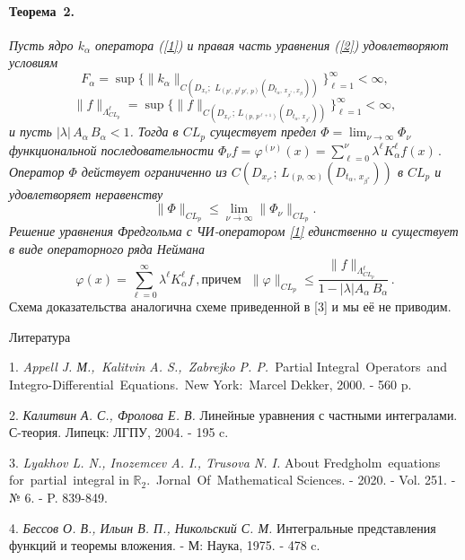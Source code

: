 \documentclass{vzmsthesis}
\begin{document}
\paragraph{Теорема~2.}
{\it Пусть 
ядро $k_\alpha$ оператора (\ref{1}) и правая часть уравнения (\ref{2}) удовлетворяют условиям 
$$F_\alpha=\sup \biggl\{\|k_{\alpha}\|_{C(D_{x_\tau};\,\, L_{(p',\,p^\ell\, p',\, p)}(D_{t_\alpha,\, x_{\beta^*}\,, x_\beta}))}\biggl\}_{\ell=1}^\infty<\infty,$$
 $$\|f\|_{\Lambda_{CL_p}^{\ell}}=\sup \biggl\{\|f\|_{C(D_{x_{\tau^*}};\,L_{(p,\,p^{\ell+1})}(D_{t_\alpha,\,x_{\beta^*}}))}\biggl\}_{\ell=1}^\infty<\infty,$$
и пусть    $|\lambda|\,A_\alpha\,B_\alpha<1$. Тогда в  $CL_p$ существует предел  $\Phi=\lim_{\nu\to\infty}\Phi_\nu$
функциональной последовательности
$
\Phi_\nu f= \varphi^{(\nu)}(x)=\sum\limits_{\ell=0}^\nu \lambda^\ell K_\alpha^\ell f(x)\,.
$
Оператор $\Phi$ действует ограниченно из $C(D_{x_{\tau^*}};\,L_{(p,\,\infty)}(D_{t_\alpha,\,x_{\beta^*}}))$ в 
 $CL_p$  и удовлетворяет неравенству
$$
\|\Phi\|_{CL_p}\leq{\lim_{\overline{\nu\to\infty}}}\|\Phi_\nu\|_{CL_p}.
$$
 Решение уравнения Фредгольма  с ЧИ-оператором
\eqref{1} единственно и существует в виде операторного ряда Неймана 
$$
\varphi(x)=\sum\limits_{\ell=0}^\infty \lambda^\ell K_\alpha^\ell f\,,
\text{причем}\,\,\,\,\|\varphi\|_{CL_{p}}\leq\frac{\|f\|_{\Lambda_{CL_p}^\ell}}{1-|\lambda| A_\alpha\,B_\alpha}\,.
$$}
Схема доказательства аналогична схеме приведенной в [3] и мы её не приводим.

\begin{center}
Литература
\end{center}

1. {\it Appell J. М.,\, Kalitvin A. S.,\, Zabrejko P. P.}\, Partial Integral\, Operators\, and\, Integro-Differential\, Equations.\, New York:\, Marcel Dekker, 2000. - 560 p.

2. {\it Калитвин А. С., Фролова Е. В.} 
Линейные уравнения с частными интегралами. С-теория. Липецк: ЛГПУ, 2004. - 195 c.

3. {\it Lyakhov L. N., Inozemcev A. I., Trusova N. I.} About Fredgholm\, equations\, for\, partial\, integral in $\mathbb{R}_2$.\, Jornal\, Of\, Mathematical Sciences. - 2020. - Vol. 251. - № 6. - P. 839-849.

4. {\it Бессов О. В., Ильин В. П., Никольский С. М.} Интегральные представления функций и теоремы вложения. - М: Наука, 1975. - 478 c.
\end{document}
